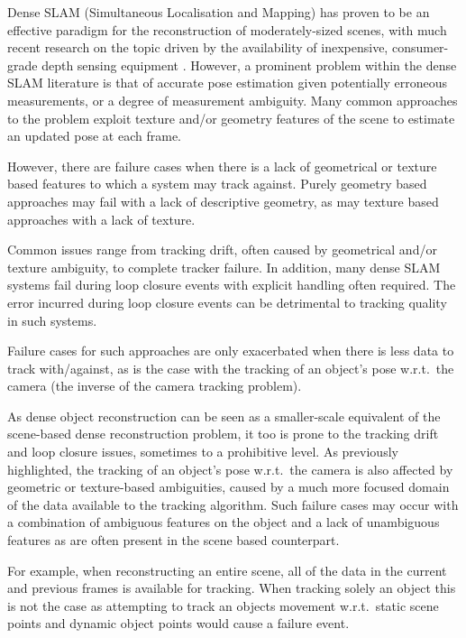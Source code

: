 Dense SLAM (Simultaneous Localisation and Mapping) has proven to be an effective paradigm for the reconstruction of moderately-sized scenes,
with much recent research on the topic driven by the availability of inexpensive, consumer-grade depth sensing equipment \cite{Newcombe2011,Niessner2013,Prisacariu2014}. 
However, a prominent problem within the dense SLAM literature is that of accurate pose estimation given potentially erroneous measurements, or a degree of measurement ambiguity. Many common approaches to the problem exploit texture and/or geometry features of the scene to estimate 
an updated pose at each frame.

However, there are failure cases when there is a lack of geometrical or texture based features to which a system may track against. Purely geometry 
based approaches may fail with a lack of descriptive geometry, as may texture based approaches with a lack of texture. 

Common issues range from tracking drift, often caused by geometrical and/or texture ambiguity, to complete tracker failure. In addition, many dense 
SLAM systems fail during loop closure events with explicit handling often required. The error incurred during loop closure events can be detrimental 
to tracking quality in such systems. 

Failure cases for such approaches are only exacerbated when there is less data to track with/against, as is the case with the tracking of an 
object's pose w.r.t.\ the camera (the inverse of the camera tracking problem).

As dense object reconstruction can be seen as a smaller-scale equivalent of the scene-based dense reconstruction problem, it too is prone to the
tracking drift and loop closure issues, sometimes to a prohibitive level. As previously highlighted, the tracking of an object's pose w.r.t.\ the camera 
is also affected by geometric or texture-based ambiguities, caused by a much more focused domain of the data available to the tracking algorithm. 
Such failure cases may occur with a combination of ambiguous features on the object and a lack of unambiguous features as are often present 
in the scene based counterpart.

For example, when reconstructing an entire scene, all of the data in the current and previous frames is available for tracking. When tracking solely an object this is not the case as attempting to track an objects movement w.r.t.\ static scene points and dynamic object points would cause a failure 
event.

